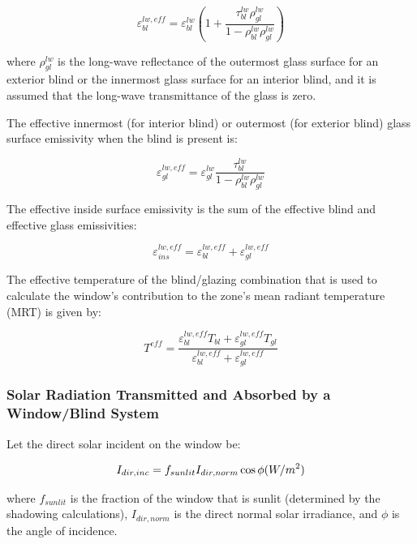 \begin{equation}
\varepsilon_{bl}^{lw,eff} = \varepsilon_{bl}^{lw}\left( {1 + \frac{{\tau_{bl}^{lw}\rho_{gl}^{lw}}}{{1 - \rho_{bl}^{lw}\rho_{gl}^{lw}}}} \right)
\end{equation}

where \(\rho_{gl}^{lw}\) is the long-wave reflectance of the outermost glass surface for an exterior blind or the innermost glass surface for an interior blind, and it is assumed that the long-wave transmittance of the glass is zero.

The effective innermost (for interior blind) or outermost (for exterior blind) glass surface emissivity when the blind is present is:

\begin{equation}
\varepsilon_{gl}^{lw,eff} = \varepsilon_{gl}^{lw}\frac{{\tau_{bl}^{lw}}}{{1 - \rho_{bl}^{lw}\rho_{gl}^{lw}}}
\end{equation}

The effective inside surface emissivity is the sum of the effective blind and effective glass emissivities:

\begin{equation}
\varepsilon_{ins}^{lw,eff} = \varepsilon_{bl}^{lw,eff} + \varepsilon_{gl}^{lw,eff}
\end{equation}

The effective temperature of the blind/glazing combination that is used to calculate the window's contribution to the zone's mean radiant temperature (MRT) is given by:

\begin{equation}
T_{}^{eff} = \frac{{\varepsilon_{bl}^{lw,eff}{T_{bl}} + \varepsilon_{gl}^{lw,eff}{T_{gl}}}}{{\varepsilon_{bl}^{lw,eff} + \varepsilon_{gl}^{lw,eff}}}
\end{equation}

\subsubsection{Solar Radiation Transmitted and Absorbed by a Window/Blind System}\label{solar-radiation-transmitted-and-absorbed-by-a-windowblind-system}

Let the direct solar incident on the window be:

\begin{equation}
{I_{dir,inc}} = {f_{sunlit}}{I_{dir,norm}}\cos \phi {\rm{    }}(W/{m^2})
\end{equation}

where \({f_{sunlit}}\) is the fraction of the window that is sunlit (determined by the shadowing calculations), \({I_{dir,norm}}\) is the direct normal solar irradiance, and \(\phi\) is the angle of incidence.

